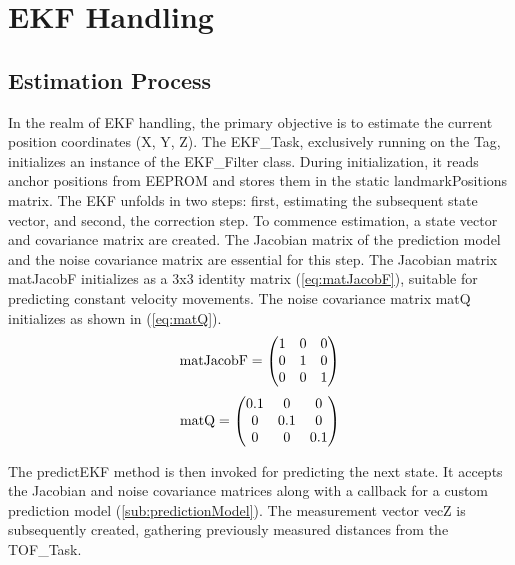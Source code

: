 \chapter{EKF Handling}
\label{chap:EKF_Handling}
\section{Estimation Process}
\label{sec:Estimation_Process}
In the realm of EKF handling, the primary objective is to estimate the current position coordinates (X, Y, Z). The EKF\_Task, exclusively running on the Tag, initializes an instance of the EKF\_Filter class. During initialization, it reads anchor positions from EEPROM and stores them in the static landmarkPositions matrix.
\vspace{4pt}
\newline
The EKF unfolds in two steps: first, estimating the subsequent state vector, and second, the correction step. To commence estimation, a state vector and covariance matrix are created. The Jacobian matrix of the prediction model and the noise covariance matrix are essential for this step. The Jacobian matrix matJacobF initializes as a 3x3 identity matrix (\ref{eq:matJacobF}), suitable for predicting constant velocity movements. The noise covariance matrix matQ initializes as shown in (\ref{eq:matQ}).
\begin{equation}
	\begin{centering}
		\textrm{matJacobF} =
		\begin{pmatrix}
			1 & 0 & 0 \\
			0 & 1 & 0 \\
			0 & 0 & 1
		\end{pmatrix}
	\end{centering}
	\label{eq:matJacobF}
\end{equation}
\begin{equation}
	\begin{centering}
		\textrm{matQ} =
		\begin{pmatrix}
			0.1 & 0 & 0 \\
			0 & 0.1 & 0 \\
			0 & 0 & 0.1
		\end{pmatrix}
	\end{centering}
	\label{eq:matQ}
\end{equation}

The predictEKF method is then invoked for predicting the next state. It accepts the Jacobian and noise covariance matrices along with a callback for a custom prediction model (\ref{sub:predictionModel}). The measurement vector vecZ is subsequently created, gathering previously measured distances from the TOF\_Task.

